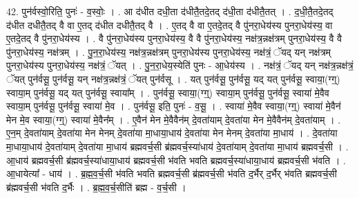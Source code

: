 \documentclass[17pt]{extarticle}
\begin{document}
42. पुन॑र्वस्वो॒रिति॒ पुनः॑ - व॒स्वोः॒ । . आ द॑धीत दधी॒ता द॑धीतै॒तदे॒तद् द॑धी॒ता द॑धीतै॒तत् । . द॒धी॒तै॒तदे॒तद् द॑धीत दधीतै॒तद् वै वा ए॒तद् द॑धीत दधीतै॒तद् वै । . ए॒तद् वै वा ए॒तदे॒तद् वै पु॑नरा॒धेय॑स्य पुनरा॒धेय॑स्य॒ वा ए॒तदे॒तद् वै पु॑नरा॒धेय॑स्य । . वै पु॑नरा॒धेय॑स्य पुनरा॒धेय॑स्य॒ वै वै पु॑नरा॒धेय॑स्य॒ नक्ष॑त्र॒न्नक्ष॑त्रम् पुनरा॒धेय॑स्य॒ वै वै पु॑नरा॒धेय॑स्य॒ नक्ष॑त्रम् । . पु॒न॒रा॒धेय॑स्य॒ नक्ष॑त्र॒न्नक्ष॑त्रम् पुनरा॒धेय॑स्य पुनरा॒धेय॑स्य॒ नक्ष॑त्रं॒ ॅयद् यन् नक्ष॑त्रम् पुनरा॒धेय॑स्य पुनरा॒धेय॑स्य॒ नक्ष॑त्रं॒ ॅयत् । . पु॒न॒रा॒धेय॒स्येति॑ पुनः - आ॒धेय॑स्य । . नक्ष॑त्रं॒ ॅयद् यन् नक्ष॑त्र॒न्नक्ष॑त्रं॒ ॅयत् पुन॑र्वसू॒ पुन॑र्वसू॒ यन् नक्ष॑त्र॒न्नक्ष॑त्रं॒ ॅयत् पुन॑र्वसू । . यत् पुन॑र्वसू॒ पुन॑र्वसू॒ यद् यत् पुन॑र्वसू॒ स्वाया॒(ग्ग्॒) स्वाया॒म् पुन॑र्वसू॒ यद् यत् पुन॑र्वसू॒ स्वाया᳚म् । . पुन॑र्वसू॒ स्वाया॒(ग्ग्॒) स्वाया॒म् पुन॑र्वसू॒ पुन॑र्वसू॒ स्वाया॑ मे॒वैव स्वाया॒म् पुन॑र्वसू॒ पुन॑र्वसू॒ स्वाया॑ मे॒व । . पुन॑र्वसू॒ इति॒ पुनः॑ - व॒सू॒ । . स्वाया॑ मे॒वैव स्वाया॒(ग्ग्॒) स्वाया॑ मे॒वैन॑ मेन मे॒व स्वाया॒(ग्ग्॒) स्वाया॑ मे॒वैन᳚म् । . ए॒वैन॑ मेन मे॒वैवैन॑म् दे॒वता॑याम् दे॒वता॑या मेन मे॒वैवैन॑म् दे॒वता॑याम् । . ए॒न॒म् दे॒वता॑याम् दे॒वता॑या मेन मेनम् दे॒वता॑या मा॒धाया॒धाय॑ दे॒वता॑या मेन मेनम् दे॒वता॑या मा॒धाय॑ । . दे॒वता॑या मा॒धाया॒धाय॑ दे॒वता॑याम् दे॒वता॑या मा॒धाय॑ ब्रह्मवर्च॒सी ब्र॑ह्मवर्च॒स्या॑धाय॑ दे॒वता॑याम् दे॒वता॑या मा॒धाय॑ ब्रह्मवर्च॒सी । . आ॒धाय॑ ब्रह्मवर्च॒सी ब्र॑ह्मवर्च॒स्या॑धाया॒धाय॑ ब्रह्मवर्च॒सी भ॑वति भवति ब्रह्मवर्च॒स्या॑धाया॒धाय॑ ब्रह्मवर्च॒सी भ॑वति । . आ॒धायेत्या᳚ - धाय॑ । . ब्र॒ह्म॒व॒र्च॒सी भ॑वति भवति ब्रह्मवर्च॒सी ब्र॑ह्मवर्च॒सी भ॑वति द॒र्भैर् द॒र्भैर् भ॑वति ब्रह्मवर्च॒सी ब्र॑ह्मवर्च॒सी भ॑वति द॒र्भैः । . ब्र॒ह्म॒व॒र्च॒सीति॑ ब्रह्म - व॒र्च॒सी । \newline
\end{document}

